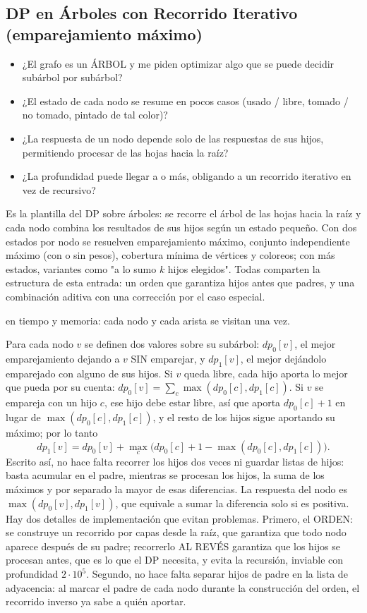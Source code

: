 \subsection{DP en Árboles con Recorrido Iterativo (emparejamiento máximo)}
\label{alg:6-6}


\begin{itemize}
\item ¿El grafo es un ÁRBOL y me piden optimizar algo que se puede decidir subárbol por subárbol?
\item ¿El estado de cada nodo se resume en pocos casos (usado / libre, tomado / no tomado, pintado de tal color)?
\item ¿La respuesta de un nodo depende solo de las respuestas de sus hijos, permitiendo procesar de las hojas hacia la raíz?
\item ¿La profundidad puede llegar a  o más, obligando a un recorrido iterativo en vez de recursivo?
\end{itemize}

 Es la plantilla del DP sobre árboles: se recorre el árbol de las hojas hacia la raíz y cada nodo combina los resultados de sus hijos según un estado pequeño. Con dos estados por nodo se resuelven emparejamiento máximo, conjunto independiente máximo (con o sin pesos), cobertura mínima de vértices y coloreos; con más estados, variantes como "a lo sumo $k$ hijos elegidos". Todas comparten la estructura de esta entrada: un orden que garantiza hijos antes que padres, y una combinación aditiva con una corrección por el caso especial.

  en tiempo y memoria: cada nodo y cada arista se visitan una vez.

 Para cada nodo $v$ se definen dos valores sobre su subárbol: $dp_0[v]$, el mejor emparejamiento dejando a $v$ SIN emparejar, y $dp_1[v]$, el mejor dejándolo emparejado con alguno de sus hijos. Si $v$ queda libre, cada hijo aporta lo mejor que pueda por su cuenta: $dp_0[v] = \sum_{c} \max(dp_0[c], dp_1[c])$. Si $v$ se empareja con un hijo $c$, ese hijo debe estar libre, así que aporta $dp_0[c] + 1$ en lugar de $\max(dp_0[c], dp_1[c])$, y el resto de los hijos sigue aportando su máximo; por lo tanto
\[dp_1[v] = dp_0[v] + \max_{c}\big(dp_0[c] + 1 - \max(dp_0[c], dp_1[c])\big).\]
Escrito así, no hace falta recorrer los hijos dos veces ni guardar listas de hijos: basta acumular en el padre, mientras se procesan los hijos, la suma de los máximos y por separado la mayor de esas diferencias. La respuesta del nodo es $\max(dp_0[v], dp_1[v])$, que equivale a sumar la diferencia solo si es positiva. Hay dos detalles de implementación que evitan problemas. Primero, el ORDEN: se construye un recorrido por capas desde la raíz, que garantiza que todo nodo aparece después de su padre; recorrerlo AL REVÉS garantiza que los hijos se procesan antes, que es lo que el DP necesita, y evita la recursión, inviable con profundidad $2\cdot10^5$. Segundo, no hace falta separar hijos de padre en la lista de adyacencia: al marcar el padre de cada nodo durante la construcción del orden, el recorrido inverso ya sabe a quién aportar.

